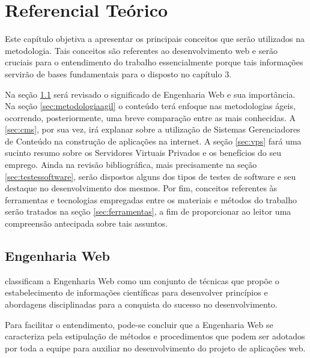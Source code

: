 \chapter{Referencial Teórico}

\hspace{2.5cm}

Este capítulo objetiva a apresentar os principais conceitos que serão utilizados na metodologia. Tais conceitos são referentes ao desenvolvimento web e serão cruciais para o entendimento do trabalho essencialmente porque tais informações servirão de bases fundamentais para o disposto no capítulo 3.%

Na seção \ref{sec:engenhariaweb} será revisado o significado de Engenharia Web e sua importância. Na seção \ref{sec:metodologiaagil} o conteúdo terá enfoque nas metodologias ágeis, ocorrendo, posteriormente, uma breve comparação entre as mais conhecidas. A \ref{sec:cms}, por sua vez, irá explanar sobre a utilização de Sistemas Gerenciadores de Conteúdo na construção de aplicações na internet. A seção \ref{sec:vps} fará uma sucinto resumo sobre os Servidores Virtuais Privados e os benefícios do seu emprego. Ainda na revisão bibliográfica, mais precisamente na seção \ref{sec:testessoftware}, serão dispostos alguns dos tipos de testes de software e seu destaque no desenvolvimento dos mesmos. Por fim, conceitos referentes às ferramentas e tecnologias empregadas entre os materiais e métodos do trabalho serão tratados na seção \ref{sec:ferramentas}, a fim de proporcionar ao leitor uma compreensão antecipada sobre tais assuntos. 

\hspace{2.5cm}

\section{Engenharia Web}
\label{sec:engenhariaweb}
\hspace{2.5cm}

 classificam a Engenharia Web como um conjunto de técnicas que propõe o estabelecimento de informações científicas para desenvolver princípios e abordagens disciplinadas para a conquista do sucesso no desenvolvimento. 

Para facilitar o entendimento, pode-se concluir que a Engenharia Web se caracteriza pela estipulação de métodos e procedimentos que podem ser adotados por toda a equipe para auxiliar no desenvolvimento do projeto de aplicações web.

